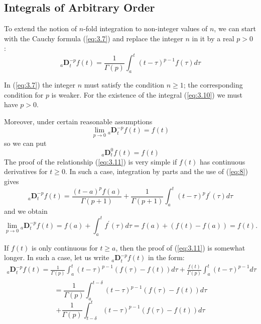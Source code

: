 \documentclass[a4paper,14pt,oneside]{book}
\theoremstyle{plain}
\theoremstyle{definition}
\theoremstyle{remark}
\begin{document}
\begin{center}
\begin{flushleft}
\section{Integrals of Arbitrary Order}
To extend the notion of $n$-fold integration to non-integer values of $n$, we can start with the Cauchy formula (\ref{eq:3.7}) and replace the integer $n$ in it by a real $p>0$ :
\begin{equation}\label{eq:3.10}
{ }_{a} \mathbf{D}_{t}^{-p} f(t)=\frac{1}{\Gamma(p)} \int_{a}^{t}(t-\tau)^{p-1} f(\tau) d \tau
\end{equation}
\par In (\ref{eq:3.7}) the integer $n$ must satisfy the condition $n \geq 1$; the corresponding condition for $p$ is weaker. For the existence of the integral (\ref{eq:3.10}) we must have $p>0$.
\par Moreover, under certain reasonable assumptions
\begin{equation}\label{eq:3.11}
\lim _{p \rightarrow 0}{ }_{a} \mathbf{D}_{t}^{-p} f(t)=f(t)
\end{equation}
so we can put
\begin{equation}\label{eq:3.12}
{ }_{a} \mathbf{D}_{t}^{0} f(t)=f(t)
\end{equation}
The proof of the relationship (\ref{eq:3.11}) is very simple if $f(t)$ has continuous derivatives for $t \geq 0$. In such a case, integration by parts and the use of (\ref{eq:8}) gives
$$
{ }_{a} \mathbf{D}_{t}^{-p} f(t)=\frac{(t-a)^{p} f(a)}{\Gamma(p+1)}+\frac{1}{\Gamma(p+1)} \int_{a}^{t}(t-\tau)^{p} f^{\prime}(\tau) d \tau
$$
and we obtain
$$
\lim _{p \rightarrow 0}{ }_{a} \mathbf{D}_{t}^{-p} f(t)=f(a)+\int_{a}^{t} f^{\prime}(\tau) d \tau=f(a)+(f(t)-f(a))=f(t) .
$$
\par If $f(t)$ is only continuous for $t \geq a$, then the proof of (\ref{eq:3.11}) is somewhat longer. In such a case, let us write ${ }_{a} \mathbf{D}_{t}^{-p} f(t)$ in the form:
$$
\begin{array}{c}
{ }_{a} \mathbf{D}_{t}^{-p} f(t)=\frac{1}{\Gamma(p)} \int_{a}^{t}(t-\tau)^{p-1}(f(\tau)-f(t)) d \tau+\frac{f(t)}{\Gamma(p)} \int_{a}^{t}(t-\tau)^{p-1} d \tau \\
\end{array}
$$
\begin{equation}\label{eq:3.13}
=\frac{1}{\Gamma(p)} \int_{a}^{t-\delta}(t-\tau)^{p-1}(f(\tau)-f(t)) d \tau
\end{equation}
\begin{equation}\label{eq:3.14}
+\frac{1}{\Gamma(p)} \int_{t-\delta}^{t}(t-\tau)^{p-1}(f(\tau)-f(t)) d \tau

\end{equation}
\end{flushleft}
\end{center}
\end{document}
